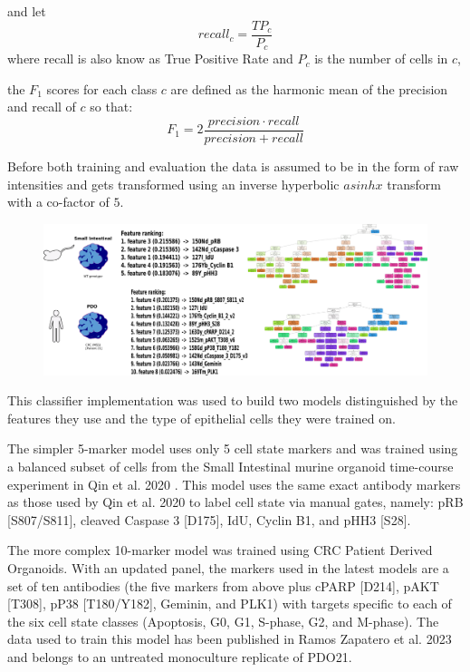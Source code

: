and let
\[recall_c = \frac{TP_c}{P_c}\]
where recall is also know as True Positive Rate and $P_c$ is the number of cells in $c$,

the $F_1$ scores for each class $c$ are defined as the harmonic mean of the precision and recall of $c$ so that:
\[F_1 = 2 \frac{precision \cdot recall}{precision + recall}\]

Before both training and evaluation the data is assumed to be in the form of raw intensities and gets transformed using an inverse hyperbolic \(asinh x\) transform with a co-factor of \(5\). 

\begin{figure}
    \centering
    \includegraphics{02methods/figs/2CYTOF_trainRFclass.png}
    \caption{}
    \label{}
\end{figure}

This classifier implementation was used to build two models distinguished by the features they use and the type of epithelial cells they were trained on. 

The simpler 5-marker model uses only 5 cell state markers and was trained using a balanced subset of cells from the Small Intestinal murine organoid time-course experiment in Qin et al. 2020 \cite{qin_cell-type-specific_2020}. This model uses the same exact antibody markers as those used by Qin et al. 2020 to label cell state via manual gates, namely: pRB [S807/S811], cleaved Caspase 3 [D175], IdU, Cyclin B1, and pHH3 [S28].

The more complex 10-marker model was trained using CRC Patient Derived Organoids. With an updated panel, the markers used in the latest models are a set of ten antibodies (the five markers from above plus cPARP [D214], pAKT [T308], pP38 [T180/Y182], Geminin, and PLK1) with targets specific to each of the six cell state classes (Apoptosis, G0, G1, S-phase, G2, and M-phase). The data used to train this model has been published in Ramos Zapatero et al. 2023 \cite{zapatero_trellis_2023} and belongs to an untreated monoculture replicate of PDO21. 

